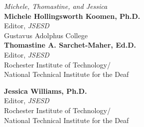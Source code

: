 \documentclass[11.5pt]{sig-alternate}
\begin{document}
\begin{large}
\textit{Michele, Thomastine, and Jessica}\\

\textbf{Michele Hollingsworth Koomen, Ph.D.}\\
Editor, \textit{JSESD}\\
Gustavus Adolphus College\\

\textbf{Thomastine A. Sarchet-Maher, Ed.D.}\\
Editor, \textit{JSESD}\\
Rochester Institute of Technology/\\
National Technical Institute for the Deaf

\textbf{Jessica Williams, Ph.D.}\\
Editor, \textit{JSESD}\\
Rochester Institute of Technology/\\
National Technical Institute for the Deaf

\end{large}
\end{document}
